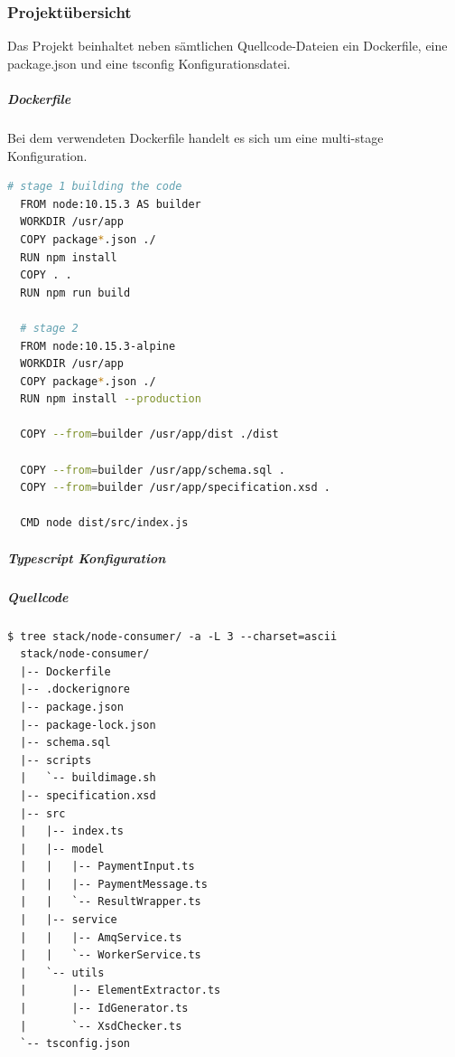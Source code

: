 
\subsubsection{Projektübersicht}
Das Projekt beinhaltet neben sämtlichen Quellcode-Dateien ein Dockerfile, eine package.json und eine tsconfig Konfigurationsdatei. 

\subparagraph{Dockerfile}
Bei dem verwendeten Dockerfile handelt es sich um eine multi-stage Konfiguration. 

\begin{lstlisting}[language=bash]
  # stage 1 building the code
  FROM node:10.15.3 AS builder
  WORKDIR /usr/app
  COPY package*.json ./
  RUN npm install
  COPY . .
  RUN npm run build 
  
  # stage 2
  FROM node:10.15.3-alpine
  WORKDIR /usr/app
  COPY package*.json ./
  RUN npm install --production
  
  COPY --from=builder /usr/app/dist ./dist
  
  COPY --from=builder /usr/app/schema.sql .
  COPY --from=builder /usr/app/specification.xsd .
  
  CMD node dist/src/index.js
\end{lstlisting}

\subparagraph{Typescript Konfiguration}

\subparagraph{Quellcode}


\begin{minipage}{\linewidth}
\begin{lstlisting}[style=bashStyle,caption={Node.js Projektstruktur},label=lst:nodeProjStruc]
  $ tree stack/node-consumer/ -a -L 3 --charset=ascii
  stack/node-consumer/
  |-- Dockerfile
  |-- .dockerignore
  |-- package.json
  |-- package-lock.json
  |-- schema.sql
  |-- scripts
  |   `-- buildimage.sh
  |-- specification.xsd
  |-- src
  |   |-- index.ts
  |   |-- model
  |   |   |-- PaymentInput.ts
  |   |   |-- PaymentMessage.ts
  |   |   `-- ResultWrapper.ts
  |   |-- service
  |   |   |-- AmqService.ts
  |   |   `-- WorkerService.ts
  |   `-- utils
  |       |-- ElementExtractor.ts
  |       |-- IdGenerator.ts
  |       `-- XsdChecker.ts
  `-- tsconfig.json
\end{lstlisting}
\end{minipage}


